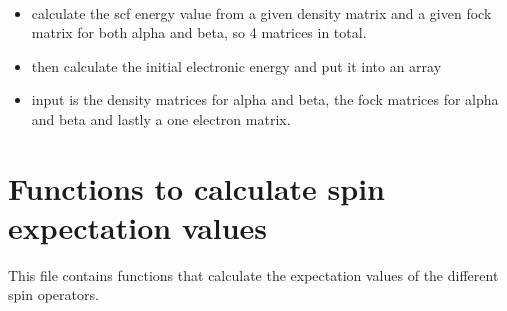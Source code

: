 \documentclass[letterpaper,10pt,english]{sphinxmanual}
\begin{document}
\begin{fulllineitems}
\label{\detokenize{SCF_functions:hf.utilities.SCF_functions.uhf_scf_energy}}~\begin{itemize}
\item {} 
calculate the scf energy value from a given density matrix and a given fock matrix for both alpha and beta,
so 4 matrices in total.

\item {} 
then calculate the initial electronic energy and put it into an array

\item {} 
input is the density matrices for alpha and beta, the fock matrices for alpha and beta and lastly a one electron
matrix.

\end{itemize}

\end{fulllineitems}

\label{\detokenize{spin:module-hf.utilities.spin}}

\chapter{Functions to calculate spin expectation values}
\label{\detokenize{spin:functions-to-calculate-spin-expectation-values}}\label{\detokenize{spin::doc}}
This file contains functions that calculate the expectation values of the different spin operators.
\end{document}
